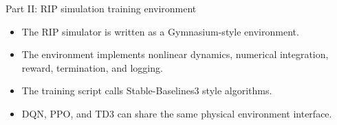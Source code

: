 \documentclass[aspectratio=169]{beamer}
\begin{document}
\begin{frame}{Part II: RIP simulation training environment}
\begin{itemize}
    \item The RIP simulator is written as a Gymnasium-style environment.
    \vspace{0.22cm}
    \item The environment implements nonlinear dynamics, numerical integration, reward, termination, and logging.
    \vspace{0.22cm}
    \item The training script calls Stable-Baselines3 style algorithms.
    \vspace{0.22cm}
    \item DQN, PPO, and TD3 can share the same physical environment interface.
\end{itemize}


\end{frame}
\end{document}
